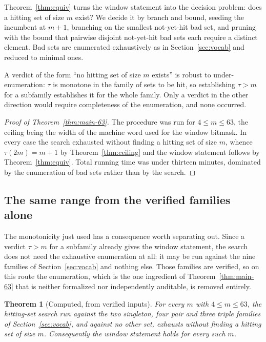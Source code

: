 \documentclass[11pt]{amsart}
\theoremstyle{plain}
\newtheorem{theorem}{Theorem}[section]
\theoremstyle{definition}
\begin{document}
Theorem~\ref{thm:equiv} turns the window statement into the decision problem: does a hitting set of
size $m$ exist? We decide it by branch and bound, seeding the incumbent at $m+1$, branching on the
smallest not-yet-hit bad set, and pruning with the bound that pairwise disjoint not-yet-hit bad sets
each require a distinct element. Bad sets are enumerated exhaustively as in Section~\ref{sec:vocab}
and reduced to minimal ones.

A verdict of the form ``no hitting set of size $m$ exists'' is robust to under-enumeration: $\tau$
is monotone in the family of sets to be hit, so establishing $\tau > m$ for a subfamily establishes
it for the whole family. Only a verdict in the other direction would require completeness of the
enumeration, and none occurred.

\begin{proof}[Proof of Theorem~\ref{thm:main-63}]
The procedure was run for $4 \le m \le 63$, the ceiling being the width of the machine word used for
the window bitmask. In every case the search exhausted without finding a hitting set of size $m$,
whence $\tau(2m) = m+1$ by Theorem~\ref{thm:ceiling} and the window statement follows by
Theorem~\ref{thm:equiv}. Total running time was under thirteen minutes, dominated by the enumeration
of bad sets rather than by the search.
\end{proof}

\subsection*{The same range from the verified families alone}
The monotonicity just used has a consequence worth separating out. Since a verdict $\tau > m$ for a
subfamily already gives the window statement, the search does not need the exhaustive enumeration at
all: it may be run against the nine families of Section~\ref{sec:vocab} and nothing else. Those
families are verified, so on this route the enumeration, which is the one ingredient of
Theorem~\ref{thm:main-63} that is neither formalized nor independently auditable, is removed
entirely.

\begin{theorem}[Computed, from verified inputs]\label{thm:fam63}
For every $m$ with $4 \le m \le 63$, the hitting-set search run against the two singleton, four pair
and three triple families of Section~\ref{sec:vocab}, and against no other set, exhausts without
finding a hitting set of size $m$. Consequently the window statement holds for every such $m$.
\end{theorem}
\end{document}
